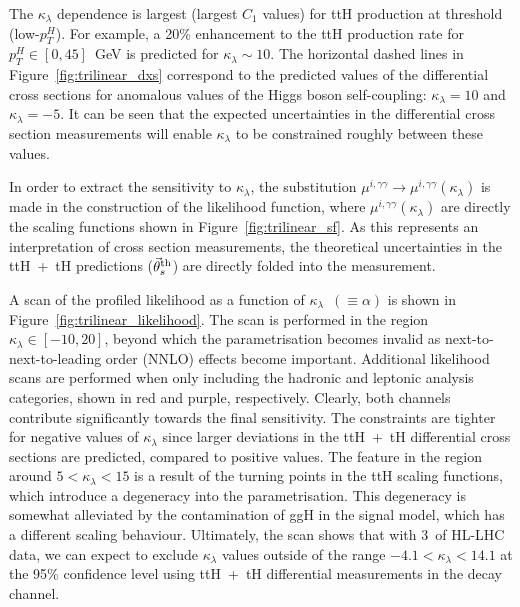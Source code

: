 The $\kappa_\lambda$ dependence is largest (largest $C_1$ values) for ttH production at threshold (low-$p_T^H$). For example, a 20\% enhancement to the ttH production rate for $p_T^H\in[0,45]$~GeV is predicted for $\kappa_\lambda \sim 10$. The horizontal dashed lines in Figure~\ref{fig:trilinear_dxs} correspond to the predicted values of the differential cross sections for anomalous values of the Higgs boson self-coupling: $\kappa_\lambda=10$ and $\kappa_\lambda=-5$. It can be seen that the expected uncertainties in the differential cross section measurements will enable $\kappa_\lambda$ to be constrained roughly between these values.

In order to extract the sensitivity to $\kappa_\lambda$, the substitution $\mu^{i,\gamma\gamma}\rightarrow\mu^{i,\gamma\gamma}(\kappa_\lambda)$ is made in the construction of the likelihood function, where $\mu^{i,\gamma\gamma}(\kappa_\lambda)$ are directly the scaling functions shown in Figure~\ref{fig:trilinear_sf}. As this represents an interpretation of cross section measurements, the theoretical uncertainties in the ttH~+~tH predictions ($\vec{\theta}^{\rm{th}}_s$) are directly folded into the measurement.

A scan of the profiled likelihood as a function of $\kappa_\lambda$~$(\equiv\alpha)$ is shown in Figure~\ref{fig:trilinear_likelihood}. The scan is performed in the region $\kappa_\lambda \in [-10,20]$, beyond which the parametrisation becomes invalid as next-to-next-to-leading order (NNLO) effects become important. Additional likelihood scans are performed when only including the hadronic and leptonic analysis categories, shown in red and purple, respectively. Clearly, both channels contribute significantly towards the final sensitivity. The constraints are tighter for negative values of $\kappa_\lambda$ since larger deviations in the ttH~+~tH differential cross sections are predicted, compared to positive values. The feature in the region around $5<\kappa_\lambda<15$ is a result of the turning points in the ttH scaling functions, which introduce a degeneracy into the parametrisation. This degeneracy is somewhat alleviated by the contamination of ggH in the signal model, which has a different scaling behaviour. Ultimately, the scan shows that with 3~\abinv of HL-LHC data, we can expect to exclude $\kappa_\lambda$ values outside of the range $-4.1<\kappa_\lambda<14.1$ at the 95\% confidence level using ttH~+~tH differential measurements in the \Hgg decay channel.

